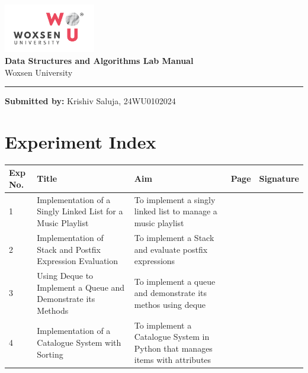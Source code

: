 \documentclass[a4paper,12pt]{article}
\begin{document}
\begin{titlepage}
    \centering
        \vspace*{2cm}
        \includegraphics[width=4cm]{woxsen_logo.png}\\[1cm]
        \Huge \textbf{Data Structures and Algorithms Lab Manual}\\[1cm]
        \Large Woxsen University\\[0.5cm]
\vspace*{\fill}
\noindent\rule{\textwidth}{1pt}
\vspace{0.5cm}
\begin{flushleft}
    \small \textbf{Submitted by:} Krishiv Saluja, 24WU0102024
\end{flushleft}
\end{titlepage}


\section*{Experiment Index}
\begin{tabular}{|p{1cm}|p{5cm}|p{5cm}|p{1cm}|p{2cm}|}
    \hline
    \textbf{Exp No.} & \textbf{Title} & \textbf{Aim} & \textbf{Page} & \textbf{Signature} \\
    \hline
    1 & Implementation of a Singly Linked List for a Music Playlist & To implement a singly linked list to manage a music playlist & \pageref{sec:exp1} & \\
    \hline
    2 & Implementation of Stack and Postfix Expression Evaluation & To implement a Stack and evaluate postfix expressions & \pageref{sec:exp2} & \\
    \hline
    3 & Using Deque to Implement a Queue and Demonstrate its Methods & To implement a queue and demonstrate its methos using deque & \pageref{sec:exp3} &\\
    \hline
    4 &Implementation of a Catalogue System with Sorting&To implement a Catalogue System in Python that manages items with attributes & \pageref{sec:exp4} &\\
    \hline
\end{tabular}
\clearpage

\end{document}
